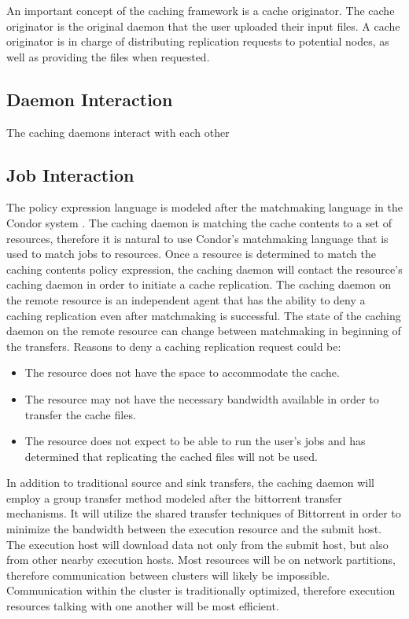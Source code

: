 An important concept of the caching framework is a cache originator.  The cache originator is the original daemon that the user uploaded their input files.  A cache originator is in charge of distributing replication requests to potential nodes, as well as providing the files when requested.

\subsection{Daemon Interaction}

The caching daemons interact with each other


\subsection{Job Interaction}





The policy expression language is modeled after the matchmaking language in the Condor system \cite{raman1998matchmaking}.  The caching daemon is matching the cache contents to a set of resources, therefore it is natural to use Condor's matchmaking language that is used to match jobs to resources.  Once a resource is determined to match the caching contents policy expression, the caching daemon will contact the resource's caching daemon in order to initiate a cache replication.  The caching daemon on the remote resource is an independent agent that has the ability to deny a caching replication even after matchmaking is successful.  The state of the caching daemon on the remote resource can change between matchmaking in beginning of the transfers.  Reasons to deny a caching replication request could be:

\begin{itemize}
\item The resource does not have the space to accommodate the cache.
\item The resource may not have the necessary bandwidth available in order to transfer the cache files.
\item The resource does not expect to be able to run the user's jobs and has determined that replicating the cached files will not be used.
\end{itemize}

In addition to traditional source and sink transfers, the caching daemon will employ a group transfer method modeled after the bittorrent \cite{cohen2008bittorrent} transfer mechanisms.  It will utilize the shared transfer techniques of Bittorrent in order to minimize the bandwidth between the execution resource and the submit host.  The execution host will download data not only from the submit host, but also from other nearby execution hosts.  Most resources will be on network partitions, therefore communication between clusters will likely be impossible.  Communication within the cluster is traditionally optimized, therefore execution resources talking with one another will be most efficient.

